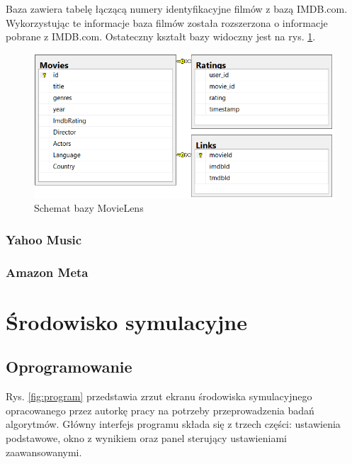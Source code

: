 \documentclass[twoside]{iisthesis}
\begin{document}
		Baza zawiera tabelę łączącą numery identyfikacyjne filmów z bazą IMDB.com. Wykorzystując te informacje baza filmów została rozszerzona o informacje pobrane z IMDB.com. Ostateczny kształt bazy widoczny jest na rys. \ref{fig:movielens_schema}.
		
			\begin{figure}[!ht] 
				\centering
				\includegraphics[width=1\textwidth]{movielens}
				\caption{Schemat bazy MovieLens}
				\label{fig:movielens_schema}
			\end{figure}
		
		\subsubsection{Yahoo Music}
		
		
		\subsubsection{Amazon Meta}
		
		
			\cite{leskovec2007dynamics}
		
	\section{Środowisko symulacyjne}
	
		\subsection{Oprogramowanie}
	
		Rys. \ref{fig:program} przedstawia zrzut ekranu środowiska symulacyjnego opracowanego przez autorkę pracy na potrzeby przeprowadzenia badań algorytmów. Główny interfejs programu składa się z trzech części: ustawienia podstawowe, okno z wynikiem oraz panel sterujący ustawieniami zaawansowanymi. 
	
\end{document}
